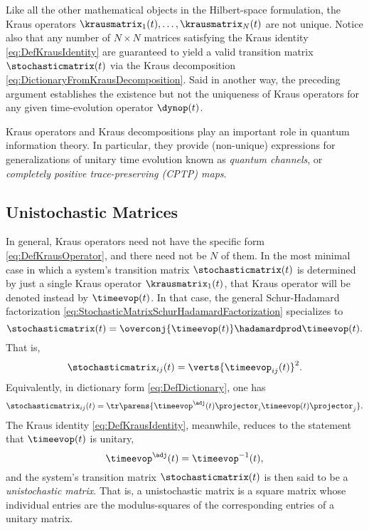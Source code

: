 \documentclass[12pt,english,prl,superscriptaddress,nobibnotes,nofootinbib]{revtex4-2}
\let\originalleft\left
\let\originalright\right
\renewcommand{\left}{\mathopen{}\mathclose\bgroup\originalleft}
\renewcommand{\right}{\aftergroup\egroup\originalright}
\begin{document}
Like all the other mathematical objects in the Hilbert-space formulation,
the Kraus operators $\krausmatrix_{1}\left(t\right),\dots,\krausmatrix_{N}\left(t\right)$
are not unique. Notice also that any number of $N\times N$ matrices
satisfying the Kraus identity \eqref{eq:DefKrausIdentity} are guaranteed
to yield a valid transition matrix $\stochasticmatrix\left(t\right)$
via the Kraus decomposition \eqref{eq:DictionaryFromKrausDecomposition}.
Said in another way, the preceding argument establishes the existence
but not the uniqueness of Kraus operators for any given time-evolution
operator $\dynop\left(t\right)$.

Kraus operators and Kraus decompositions play an important role in
quantum information theory. In particular, they provide (non-unique)
expressions for generalizations of unitary time evolution known as
\emph{quantum channels}, or \emph{completely positive trace-preserving (CPTP) maps}.

\subsection{Unistochastic Matrices\label{subsec:Unistochastic-Matrices}}

In general, Kraus operators need not have the specific form \eqref{eq:DefKrausOperator},
and there need not be $N$ of them. In the most minimal case in which
a system's transition matrix $\stochasticmatrix\left(t\right)$ is
determined by just a single Kraus operator $\krausmatrix_{1}\left(t\right)$,
that Kraus operator will be denoted instead by $\timeevop\left(t\right)$.
In that case, the general Schur-Hadamard factorization \eqref{eq:StochasticMatrixSchurHadamardFactorization}
specializes to 
\begin{equation}
\stochasticmatrix\left(t\right)=\overconj{\timeevop\left(t\right)}\hadamardprod\timeevop\left(t\right).\label{eq:UnistochasticMatrixFromSchurHadamardFactorization}
\end{equation}
 That is, 
\begin{equation}
\stochasticmatrix_{ij}\left(t\right)=\verts{\timeevop_{ij}\left(t\right)}^{2}.\label{eq:UnistochasticMatrixFromAbsValSqTimeEvOp}
\end{equation}
 Equivalently, in dictionary form \eqref{eq:DefDictionary}, one has
\begin{equation}
\stochasticmatrix_{ij}\left(t\right)=\tr\parens{\timeevop^{\adj}\left(t\right)\projector_{i}\timeevop\left(t\right)\projector_{j}}.\label{eq:UnistochasticMatrixFromDictionary}
\end{equation}
 The Kraus identity \eqref{eq:DefKrausIdentity}, meanwhile, reduces
to the statement that $\timeevop\left(t\right)$ is unitary, 
\begin{equation}
\timeevop^{\adj}\left(t\right)=\timeevop^{-1}\left(t\right),\label{eq:DefUnitaryTimeEvOp}
\end{equation}
 and the system's transition matrix $\stochasticmatrix\left(t\right)$
is then said to be a \emph{unistochastic matrix}. That is, a unistochastic
matrix is a square matrix whose individual entries are the modulus-squares
of the corresponding entries of a unitary matrix.
\end{document}
